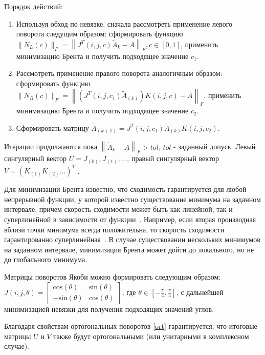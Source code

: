 Порядок действий:
\begin{enumerate}
    \item Используя обход по невязке, сначала рассмотреть применение левого поворота следущим образом: сформировать функцию \newline$\|N_{L}(c) \|_F= \left\|J^T(i,j,c)\tilde{A}_{k} - A\right\|_F, c \in [0, 1]$, применить минимизацию Брента и получить подходящее значение $c_1$.
    \item Рассмотреть применение правого поворота аналогичным образом: сформировать функцию $\|N_{R}(c) \|_F = \left\| (J^T(i,j,c_1)\tilde{A}_{(k)})K(i,j, c) - A \right\|_F$, применить минимизацию Брента и получить подходящее значение $c_2$.
    \item Сформировать матрицу $\tilde{A}_{(k+1)} =J^T(i,j,c_1)\tilde{A}_{(k)}K(i,j,c_2).$ 
    
\end{enumerate}

Итерации продолжаются пока $\left\| \tilde{A}_{k} - A\right\|_F >tol$, $tol$ - заданный допуск. Левый сингулярный вектор $U = J_{(0)}, J_{(1)}, ...$, правый сингулярный вектор $V = (K_{(1)}K_{(2)}...)^T$ .

Для минимизации Брента известно, что сходимость  гарантируется для любой непрерывной функции, у которой известно существование минимума на заданном интервале, причем скорость сходимости может быть как линейной, так и суперлинейной в зависимости от функции~\cite{Brent_2013}. Например, если вторая производная вблизи точки минимума всегда положительна, то скорость сходимости гарантированно суперлинейная~\cite{Brent1971}. В случае существовании нескольких минимумов на заданном интервале, минимизация Брента может дойти до локального, но не до глобального минимума. 

\begin{note}
    Матрицы поворотов Якоби можно формировать следующим образом:
    $J(i,j,\theta) = \begin{bmatrix}
        \mathrm{cos}(\theta)&\mathrm{sin}(\theta)\\
        \mathrm{-sin}(\theta)&\mathrm{cos}(\theta)
    \end{bmatrix}$, где $\theta \in [-\frac{\pi}{4}, \frac{\pi}{4}]$, с дальнейшей минимизацией невязки для получения подходящих значений углов. 
\end{note}

\begin{note}
    Благодаря свойствам ортогональных поворотов \eqref{ort} гарантируется, что итоговые матрицы $U$ и $V$ также будут ортогональными (или унитарными в комплексном случае). 
\end{note}


